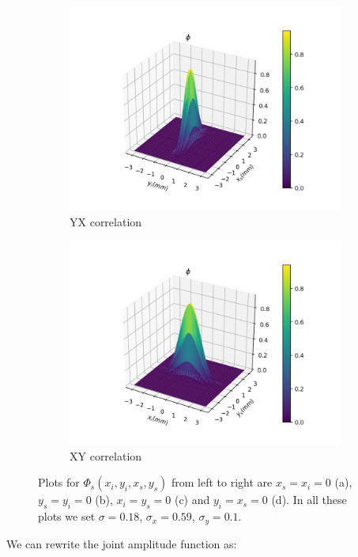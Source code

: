 \documentclass[12pt]{book}
\begin{document}
\begin{figure}[t!]
\begin{subfigure}[b]{0.45\linewidth}
\includegraphics[width=\linewidth]{images/SPDC_yx.png}
\caption{YX correlation}
\end{subfigure}
\begin{subfigure}[b]{0.45\linewidth}
\includegraphics[width=\linewidth]{images/SPDC_xy.png}
\caption{XY correlation}
\end{subfigure}
\caption{Plots for $\Phi_{s}(x_{i},y_{i},x_{s},y_{s})$  from left to right are $x_{s}=x_{i}=0$ (a), $y_{s}=y_{i}=0$ (b), $x_{i}=y_{s}=0$ (c) and $y_{i}=x_{s}=0$ (d). In all these plots we set $\sigma=0.18$, $\sigma_{x}=0.59$, $\sigma_{y}=0.1$.}
\label{SPDC}
\end{figure}

We can rewrite the joint amplitude function as:
\end{document}
